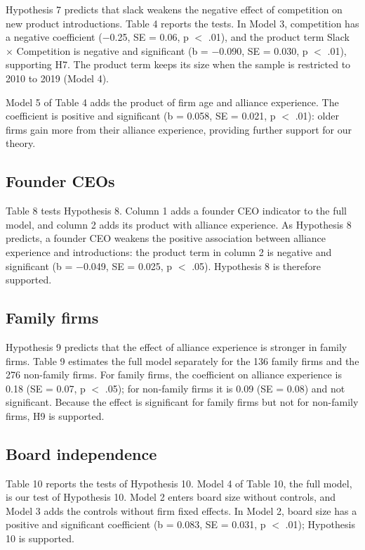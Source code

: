 \documentclass[12pt]{article}
\begin{document}
Hypothesis 7 predicts that slack weakens the negative effect of competition on new product introductions. Table 4 reports the tests. In Model 3, competition has a negative coefficient ($-$0.25, SE = 0.06, p $<$ .01), and the product term Slack $\times$ Competition is negative and significant (b = $-$0.090, SE = 0.030, p $<$ .01), supporting H7. The product term keeps its size when the sample is restricted to 2010 to 2019 (Model 4).

Model 5 of Table 4 adds the product of firm age and alliance experience. The coefficient is positive and significant (b = 0.058, SE = 0.021, p $<$ .01): older firms gain more from their alliance experience, providing further support for our theory.

\subsection{Founder CEOs}

Table 8 tests Hypothesis 8. Column 1 adds a founder CEO indicator to the full model, and column 2 adds its product with alliance experience. As Hypothesis 8 predicts, a founder CEO weakens the positive association between alliance experience and introductions: the product term in column 2 is negative and significant (b = $-$0.049, SE = 0.025, p $<$ .05). Hypothesis 8 is therefore supported.

\subsection{Family firms}

Hypothesis 9 predicts that the effect of alliance experience is stronger in family firms. Table 9 estimates the full model separately for the 136 family firms and the 276 non-family firms. For family firms, the coefficient on alliance experience is 0.18 (SE = 0.07, p $<$ .05); for non-family firms it is 0.09 (SE = 0.08) and not significant. Because the effect is significant for family firms but not for non-family firms, H9 is supported.

\subsection{Board independence}

Table 10 reports the tests of Hypothesis 10. Model 4 of Table 10, the full model, is our test of Hypothesis 10. Model 2 enters board size without controls, and Model 3 adds the controls without firm fixed effects. In Model 2, board size has a positive and significant coefficient (b = 0.083, SE = 0.031, p $<$ .01); Hypothesis 10 is supported.
\end{document}
